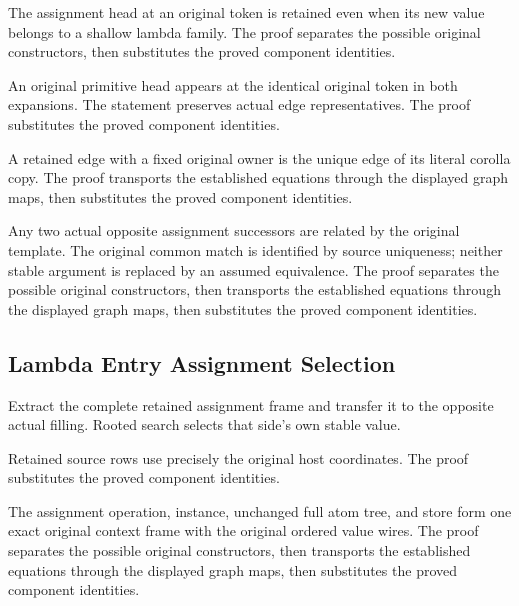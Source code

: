 The assignment head at an original token is retained even when its new
value belongs to a shallow lambda family.
The proof separates the possible original constructors, then substitutes the proved component identities.
\par{}

An original primitive head appears at the identical original token in
both expansions. The statement preserves actual edge representatives.
The proof substitutes the proved component identities.
\par{}

A retained edge with a fixed original owner is the unique edge of its
literal corolla copy.
The proof transports the established equations through the displayed graph maps, then substitutes the proved component identities.
\par{}

Any two actual opposite assignment successors are related by the
original template. The original common match is identified by source
uniqueness; neither stable argument is replaced by an assumed equivalence.
The proof separates the possible original constructors, then transports the established equations through the displayed graph maps, then substitutes the proved component identities.
\par{}

\subsection{Lambda Entry Assignment Selection}
Extract the complete retained assignment frame and transfer it to the
opposite actual filling. Rooted search selects that side's own stable value.

Retained source rows use precisely the original host coordinates.
The proof substitutes the proved component identities.
\par{}

The assignment operation, instance, unchanged full atom tree, and store
form one exact original context frame with the original ordered value wires.
The proof separates the possible original constructors, then transports the established equations through the displayed graph maps, then substitutes the proved component identities.
\par{}

